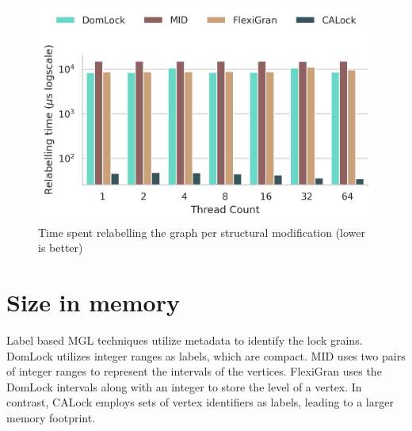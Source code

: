 

\begin{figure}[ht]
	\captionsetup{justification=centering}
	\centering
		\includegraphics[width=.7\columnwidth]{figures/PerformanceCharts/ReadWithModificationsRelabelling}
	\caption{Time spent relabelling the graph per structural modification (lower is better)}
	\label{relabellingTime}
\end{figure}


\section{Size in memory} \label{benchmark:metadatasize}


Label based MGL techniques utilize metadata to identify the lock grains.
DomLock utilizes integer ranges as labels, which are compact. 
MID uses two pairs of integer ranges to represent the intervals of the vertices.
FlexiGran uses the DomLock intervals along with an integer to store the level of a vertex.
In contrast, CALock employs sets of vertex identifiers as labels, leading to a larger memory footprint.

